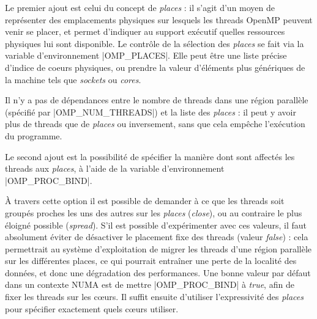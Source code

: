 Le premier ajout est celui du concept de \emph{places} : il s'agit d'un moyen de représenter des emplacements physiques sur lesquels les threads OpenMP peuvent venir se placer, et permet d'indiquer au support exécutif quelles ressources physiques lui sont disponible.
Le contrôle de la sélection des \emph{places} se fait via la variable d'environnement |OMP_PLACES|.
Elle peut être une liste précise d'indice de coeurs physiques, ou prendre la valeur d'éléments plus génériques de la machine tels que \emph{sockets} ou \emph{cores}.

Il n'y a pas de dépendances entre le nombre de threads dans une région parallèle (spécifié par |OMP_NUM_THREADS|) et la liste des \emph{places} : il peut y avoir plus de threads que de \emph{places} ou inversement, sans que cela empêche l'exécution du programme.

Le second ajout est la possibilité de spécifier la manière dont sont affectés les threads aux \emph{places}, à l'aide de la variable d'environnement |OMP_PROC_BIND|.

À travers cette option il est possible de demander à ce que les threads soit groupés proches les uns des autres sur les \emph{places} (\emph{close}), ou au contraire le plus éloigné possible (\emph{spread}).
S'il est possible d'expérimenter avec ces valeurs, il faut absolument éviter de désactiver le placement fixe des threads (valeur \emph{false}) : cela permettrait au système d'exploitation de migrer les threads d'une région parallèle sur les différentes places, ce qui pourrait entraîner une perte de la localité des données, et donc une dégradation des performances.
Une bonne valeur par défaut dans un contexte NUMA est de mettre |OMP_PROC_BIND| à \emph{true}, afin de fixer les threads sur les cœurs.
Il suffit ensuite d'utiliser l'expressivité des \emph{places} pour spécifier exactement quels cœurs utiliser.


